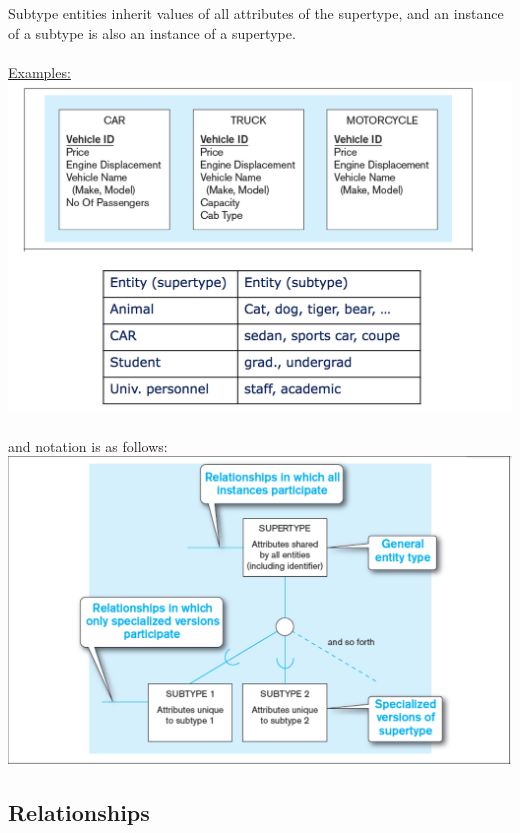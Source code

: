 \documentclass[12pt]{article}
\begin{document}
Subtype entities inherit values of all attributes of the supertype, and an instance of a subtype is also an instance of a supertype.\\
\\
\underline{Examples:}\\
\includegraphics[scale=0.5]{lec3-3}\\
\\
and notation is as follows:\\
\includegraphics[scale=0.5]{lec3-4}

\subsection{Relationships}
\end{document}
